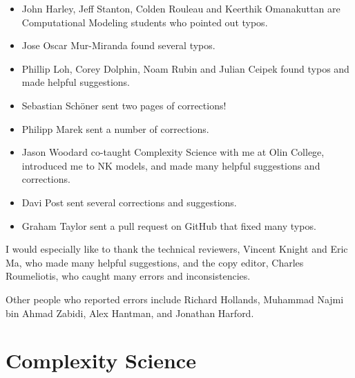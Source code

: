 \documentclass[12pt]{book}
\theoremstyle{exercise}
\begin{document}
\begin{itemize}

\item John Harley, Jeff Stanton, Colden Rouleau and
Keerthik Omanakuttan are Computational Modeling students who
pointed out typos.

\item Jose Oscar Mur-Miranda found several typos.

\item Phillip Loh, Corey Dolphin, Noam Rubin and Julian Ceipek
found typos and made helpful suggestions.


\item Sebastian Sch\"{o}ner sent two pages of corrections!

\item Philipp Marek sent a number of corrections.

\item Jason Woodard co-taught Complexity Science with me at Olin College, introduced me to NK models, and made many helpful suggestions and corrections.

\item Davi Post sent several corrections and suggestions.

\item Graham Taylor sent a pull request on GitHub that fixed many typos.


\end{itemize}

I would especially like to thank the technical reviewers, Vincent Knight and Eric Ma, who made many helpful suggestions, and the copy editor, Charles Roumeliotis, who caught many errors and inconsistencies.

Other people who reported errors include
Richard Hollands,
Muhammad Najmi bin Ahmad Zabidi,
Alex Hantman, and
Jonathan Harford.




\normalsize



\mainmatter

\chapter{Complexity Science}
\label{overview}
\end{document}
